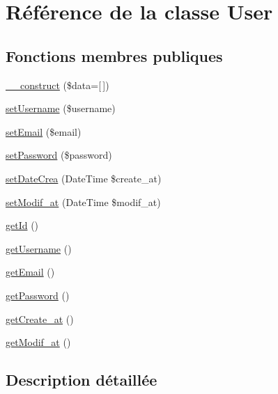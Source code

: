 \hypertarget{class_src_1_1_entity_1_1_user}{}\section{Référence de la classe User}
\label{class_src_1_1_entity_1_1_user}
\subsection*{Fonctions membres publiques}
\begin{DoxyCompactItemize}
\item 
\hyperlink{class_src_1_1_entity_1_1_user_ab3129f1d71e9f51353de9d551ea381d7}{\+\_\+\+\_\+construct} (\$data=\mbox{[}$\,$\mbox{]})
\item 
\hyperlink{class_src_1_1_entity_1_1_user_ac359b701a2ccaff746dd480f03314244}{set\+Username} (\$username)
\item 
\hyperlink{class_src_1_1_entity_1_1_user_a5ef76eef42d2624386442eeb636d338c}{set\+Email} (\$email)
\item 
\hyperlink{class_src_1_1_entity_1_1_user_a3e35c8d3dbb2c513c618a664389e0926}{set\+Password} (\$password)
\item 
\hyperlink{class_src_1_1_entity_1_1_user_a9c8311c6d2e7d1d118a6a6da7b577c0b}{set\+Date\+Crea} (Date\+Time \$create\+\_\+at)
\item 
\hyperlink{class_src_1_1_entity_1_1_user_a9f9f5983de6ae197176a80f55f113a6c}{set\+Modif\+\_\+at} (Date\+Time \$modif\+\_\+at)
\item 
\hyperlink{class_src_1_1_entity_1_1_user_a12251d0c022e9e21c137a105ff683f13}{get\+Id} ()
\item 
\hyperlink{class_src_1_1_entity_1_1_user_a81b37a3c9d639574e394f80c1138c75e}{get\+Username} ()
\item 
\hyperlink{class_src_1_1_entity_1_1_user_a02a01849f28e2535e888ae4ec87b20f2}{get\+Email} ()
\item 
\hyperlink{class_src_1_1_entity_1_1_user_a04e0957baeb7acde9c0c86556da2d43f}{get\+Password} ()
\item 
\hyperlink{class_src_1_1_entity_1_1_user_ae5e6c0bedcef3f514100c20ee92c901a}{get\+Create\+\_\+at} ()
\item 
\hyperlink{class_src_1_1_entity_1_1_user_a5858386cc69be9863ed37e0ceb2697b1}{get\+Modif\+\_\+at} ()
\end{DoxyCompactItemize}


\subsection{Description détaillée}


